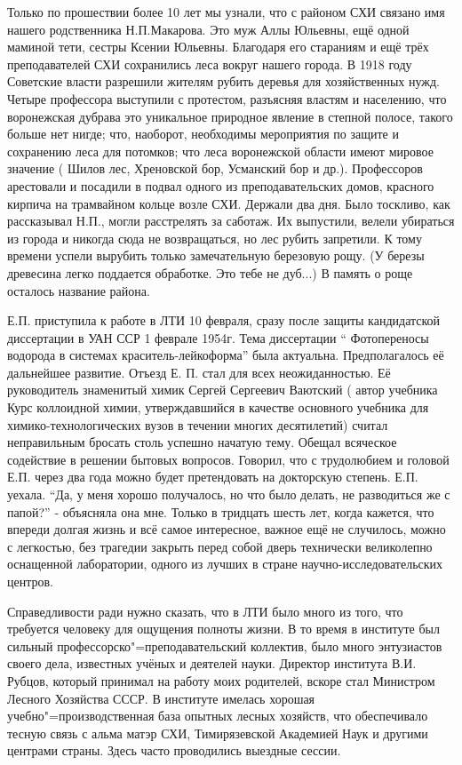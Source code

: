 Только по прошествии более 10 лет мы узнали, что с районом СХИ связано имя нашего родственника Н.П.Макарова. Это муж Аллы Юльевны, ещё одной маминой тети, сестры Ксении Юльевны. Благодаря его стараниям и ещё трёх преподавателей СХИ  сохранились леса вокруг нашего города. В 1918 году Советские власти разрешили жителям рубить деревья для хозяйственных нужд. Четыре профессора выступили с протестом, разъясняя властям и населению, что воронежская дубрава это уникальное природное явление в степной полосе, такого больше нет нигде; что, наоборот, необходимы мероприятия по защите и сохранению леса для потомков; что леса воронежской области имеют мировое значение ( Шилов лес, Хреновской бор, Усманский бор и др.). Профессоров арестовали и посадили в подвал одного из преподавательских домов, красного кирпича на трамвайном кольце возле СХИ. Держали два дня. Было тоскливо, как рассказывал Н.П., могли расстрелять за саботаж. Их выпустили, велели убираться из города и никогда сюда не возвращаться, но лес рубить запретили. К тому времени успели вырубить только замечательную березовую рощу. (У березы древесина легко поддается обработке. Это тебе не дуб...) В память о роще осталось название района.

Е.П. приступила к работе в ЛТИ 10 февраля, сразу после защиты кандидатской диссертации в УАН ССР 1 феврале 1954г. Тема диссертации “ Фотопереносы водорода в системах краситель-лейкоформа” была актуальна. Предполагалось её дальнейшее развитие. Отъезд Е. П. стал для всех неожиданностью. Её руководитель знаменитый химик Сергей Сергеевич Ваютский ( автор учебника Курс коллоидной химии, утверждавшийся в качестве основного учебника для химико-технологических вузов в течении многих десятилетий) считал неправильным бросать столь успешно начатую тему. Обещал всяческое содействие в решении бытовых вопросов. Говорил, что с трудолюбием и головой Е.П. через два года можно будет претендовать на докторскую степень. Е.П. уехала. “Да, у меня хорошо получалось, но что было делать, не разводиться же с папой?” - объясняла она мне. Только в тридцать шесть лет, когда кажется, что впереди долгая жизнь и всё самое интересное, важное ещё не случилось, можно с легкостью, без трагедии закрыть перед собой дверь технически великолепно оснащенной лаборатории, одного из лучших в стране научно-исследовательских центров.

Справедливости ради нужно сказать, что в ЛТИ было много из того, что требуется человеку для ощущения полноты жизни.
В то время в институте был сильный про\-фес\-сор\-с\-ко"=пре\-по\-да\-ва\-тель\-с\-кий коллектив,
было много энтузиастов своего дела, известных учёных и деятелей науки.
Директор института В.И. Рубцов, который принимал на работу моих родителей, вскоре стал Министром Лесного Хозяйства СССР.
В институте имелась хорошая учеб\-но"=про\-из\-вод\-с\-т\-вен\-ная база опытных лесных хозяйств, что обеспечивало тесную связь с альма матэр СХИ, Тимирязевской Академией Наук и другими центрами страны. Здесь часто проводились выездные сессии.

